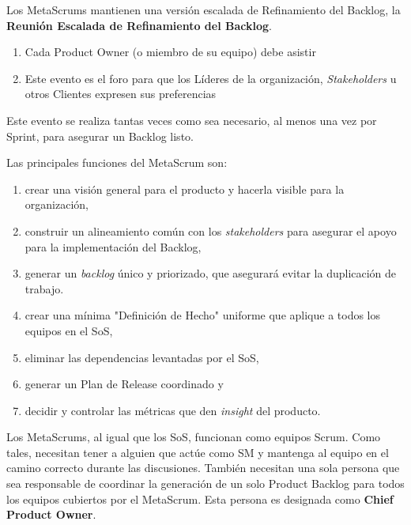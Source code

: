 \documentclass{article} %
\begin{document}
\noindent 

\noindent Los MetaScrums mantienen una versi\'{o}n escalada de Refinamiento del Backlog, la \textbf{Reuni\'{o}n Escalada de Refinamiento del Backlog}.

\begin{enumerate}
\item  Cada Product Owner (o miembro de su equipo) debe asistir

\item  Este evento es el foro para que los L\'{i}deres de la organizaci\'{o}n, \textit{Stakeholders }u otros Clientes expresen sus preferencias
\end{enumerate}

\noindent 

\noindent Este evento se realiza tantas veces como sea necesario, al menos una vez por Sprint, para asegurar un Backlog listo. 

\noindent 

\noindent Las principales funciones del MetaScrum son:

\begin{enumerate}
\item  crear una visi\'{o}n general para el producto y hacerla visible para la organizaci\'{o}n,

\item  construir un alineamiento com\'{u}n con los \textit{stakeholders }para asegurar el apoyo para la implementaci\'{o}n del Backlog,

\item  generar un \textit{backlog }\'{u}nico y priorizado, que asegurar\'{a} evitar la duplicaci\'{o}n de trabajo.

\item  crear una m\'{i}nima "Definici\'{o}n de Hecho" uniforme que aplique a todos los equipos en el SoS,

\item  eliminar las dependencias levantadas por el SoS,

\item  generar un Plan de Release coordinado y

\item  decidir y controlar las m\'{e}tricas que den \textit{insight }del producto.
\end{enumerate}

\noindent 

\noindent Los MetaScrums, al igual que los SoS, funcionan como equipos Scrum. Como tales, necesitan tener a alguien que act\'{u}e como SM y mantenga al equipo en el camino correcto durante las discusiones. Tambi\'{e}n necesitan una sola persona que sea responsable de coordinar la generaci\'{o}n de un solo Product Backlog para todos los equipos cubiertos por el MetaScrum. Esta persona es designada como \textbf{Chief Product Owner}.
\end{document}
